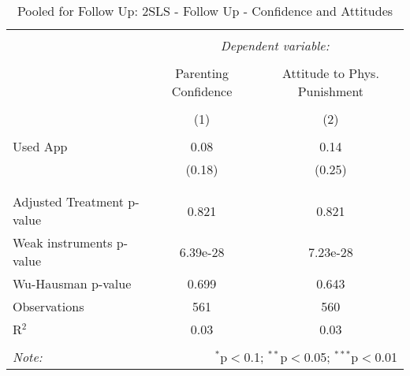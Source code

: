 
\begin{table}[!htbp] \centering 
  \caption{Pooled for Follow Up: 2SLS - Follow Up - Confidence and Attitudes} 
  \label{tbl:Pooled for Follow Up: 2SLS - Follow Up - Confidence and Attitudes} 
\begin{tabular}{@{\extracolsep{5pt}}lcc} 
\\[-1.8ex]\hline 
\hline \\[-1.8ex] 
 & \multicolumn{2}{c}{\textit{Dependent variable:}} \\ 
\cline{2-3} 
\\[-1.8ex] & Parenting Confidence & Attitude to Phys. Punishment \\ 
\\[-1.8ex] & (1) & (2)\\ 
\hline \\[-1.8ex] 
 Used App & 0.08 & 0.14 \\ 
  & (0.18) & (0.25) \\ 
  & & \\ 
\hline \\[-1.8ex] 
Adjusted Treatment p-value & 0.821 & 0.821 \\ 
Weak instruments p-value & 6.39e-28 & 7.23e-28 \\ 
Wu-Hausman p-value & 0.699 & 0.643 \\ 
Observations & 561 & 560 \\ 
R$^{2}$ & 0.03 & 0.03 \\ 
\hline 
\hline \\[-1.8ex] 
\textit{Note:}  & \multicolumn{2}{r}{$^{*}$p$<$0.1; $^{**}$p$<$0.05; $^{***}$p$<$0.01} \\ 
\end{tabular} 
\end{table} 
